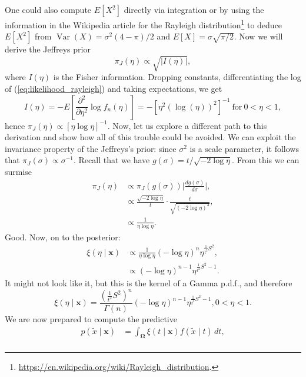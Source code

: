 \documentclass[a4paper,10pt, notitlepage]{report}
\newcommand{\vr}{\operatorname{Var}} %
\begin{document}
{One could also compute $E[X^2]$ directly via integration or by using the information in the Wikipedia article for the Rayleigh distribution\footnote{\textcolor{blue}{\url{https://en.wikipedia.org/wiki/Rayleigh_distribution}}.} to deduce $E[X^2]$ from $\vr(X) = \sigma^2(4-\pi)/2$ and $E[X] = \sigma\sqrt{\pi/2}$.
Now we will derive the Jeffreys prior
\begin{equation*}
 \pi_J(\eta) \propto \sqrt{|I(\eta)|},
\end{equation*}
where $I(\eta)$ is the Fisher information.
Dropping constants, differentiating the log of (\ref{eq:likelihood_rayleigh}) and taking expectations, we get
\begin{equation*}
 I(\eta) = - E \left[\frac{\partial^2}{\partial \eta^2} \log f_n(\eta) \right] = -\left[ \eta^2\left(\log(\eta)\right)^2 \right]^{-1} \: \text{for}\: 0 < \eta < 1,
\end{equation*}
hence $\pi_J(\eta) \propto \left[\eta \log\eta \right]^{-1}$.
Now, let us explore a different path to this derivation and show how all of this trouble could be avoided.
We can exploit the invariance property of the Jeffreys's prior: since $\sigma^2$ is a scale parameter, it follows that $\pi_J(\sigma) \propto \sigma^{-1}$.
Recall that we have $g(\sigma) = t/\sqrt{-2\log\eta}$.
From this we can surmise
\begin{align*}
 \pi_J(\eta) &\propto \pi_J(g(\sigma))\bigg\rvert\frac{dg(\sigma)}{d\sigma}\bigg\lvert,\\
 &\propto \frac{\sqrt{-2\log\eta}}{t}\cdot\frac{t}{\sqrt{\left(-2\log\eta\right)^3}},\\
 &\propto \frac{1}{\eta\log\eta}.
\end{align*}
Good.
Now, on to the posterior:
\begin{align*}
 \xi(\eta \mid \boldsymbol{x}) &\propto \frac{1}{\eta\log\eta} \left(-\log\eta\right)^{n}\eta^{\frac{1}{t^2}S^2},\\
 &\propto \left(-\log\eta\right)^{n-1}\eta^{\frac{1}{t^2}S^2 -1}.
\end{align*}
It might not look like it, but this is the kernel of a Gamma p.d.f., and therefore
\begin{equation*}
\xi(\eta \mid \boldsymbol{x}) = \frac{\left(\frac{1}{t^2}S^2 \right)^n}{\Gamma(n)} \left(-\log\eta\right)^{n-1}\eta^{\frac{1}{t^2}S^2 -1}, 0 < \eta < 1.
\end{equation*}
We are now prepared to compute the predictive
\begin{align*}
 p(\tilde{x} \mid \boldsymbol{x}) &= \int_{\boldsymbol{\Omega}} \xi(t \mid \boldsymbol{x}) f(\tilde{x} \mid t)\,dt,\\

\end{align*}}
\end{document}
